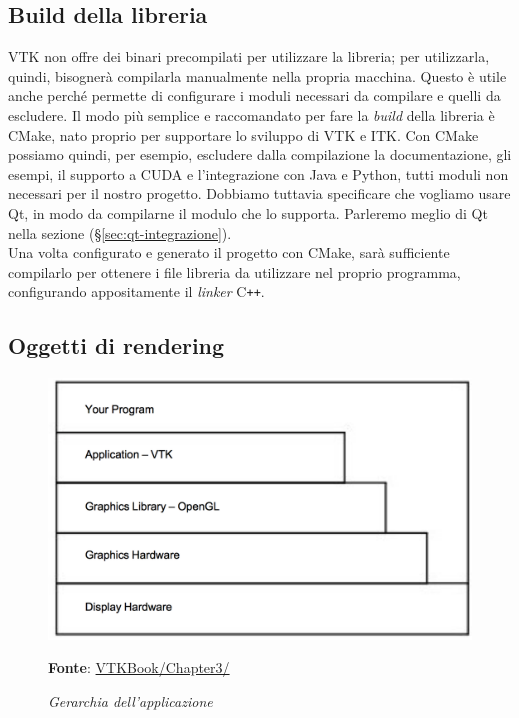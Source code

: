 \subsection{Build della libreria}\label{sec:build-liberia}
VTK non offre dei binari precompilati per utilizzare la libreria; per utilizzarla, quindi, bisognerà compilarla manualmente nella propria macchina. Questo è utile anche perché permette di configurare i moduli necessari da compilare e quelli da escludere. Il modo più semplice e raccomandato per fare la \emph{build} della libreria è CMake, nato proprio per supportare lo sviluppo di VTK e ITK. Con CMake possiamo quindi, per esempio, escludere dalla compilazione la documentazione, gli esempi, il supporto a CUDA e l'integrazione con Java e Python, tutti moduli non necessari per il nostro progetto. Dobbiamo tuttavia specificare che vogliamo usare Qt, in modo da compilarne il modulo che lo supporta. Parleremo meglio di Qt nella sezione  (§\ref{sec:qt-integrazione}).
\\
Una volta configurato e generato il progetto con CMake, sarà sufficiente compilarlo per ottenere i file libreria da utilizzare nel proprio programma, configurando appositamente il \emph{linker} C\texttt{++}.

\subsection{Oggetti di rendering}\label{sec:oggetti-rendering}
\begin{figure}[h]
    \centering
    \includegraphics[scale=0.4]{immagini/volumerendering/layers.png}
    \caption{\textit{Gerarchia dell'applicazione}}
    \textbf{Fonte}: \href{https://lorensen.github.io/VTKExamples/site/VTKBook/03Chapter3/}{VTKBook/Chapter3/}
    \label{fig: vtk-layers}
\end{figure}

